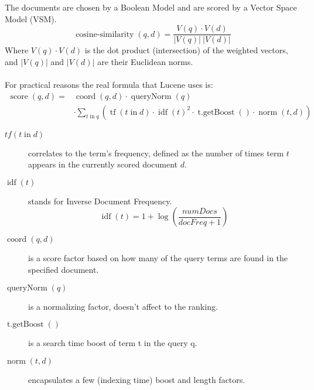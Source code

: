 The documents are chosen by a Boolean Model and are scored by a Vector Space
Model (VSM).
\[
	\operatorname{cosine-similarity}(q,d) = \frac{V(q) \cdot V(d)} {|V(q)|\ |V(d)|}
\]
%
Where \(V(q) \cdot V(d)\) is the dot product (intersection) of the weighted
vectors, and \(|V(q)|\) and \(|V(d)|\) are their Euclidean norms.\\
\\
For practical reasons the real formula that Lucene uses is:
%
\begin{equation*}
\begin{split}
	\operatorname{score}(q,d) =
	& \operatorname{coord}(q,d) \cdot
		\operatorname{queryNorm}(q)  \\
	& \cdot
		\sum_{t \operatorname{in} q} (
			\operatorname{tf}(t\operatorname{in}d) \cdot
			\operatorname{idf}(t)^{2} \cdot
			\operatorname{t.getBoost}() \cdot
			\operatorname{norm}(t,d)
		)
\end{split}
\end{equation*}
%
\begin{description}

\item[\(tf(t\operatorname{in}d)\)]
correlates to the term's frequency, defined as the number of times term \(t\)
appears in the currently scored document \(d\).

\item[\(\operatorname{idf}(t)\)]
stands for Inverse Document Frequency.
\[
	\operatorname{idf}(t) = 1 + \log(\frac{numDocs}{docFreq + 1})
\]

\item[\(\operatorname{coord}(q,d)\)]
is a score factor based on how many of the query terms are found in the
specified document.

\item[\(\operatorname{queryNorm}(q)\)]
is a normalizing factor, doesn’t affect to the ranking.

\item[\(\operatorname{t.getBoost}()\)]
is a search time boost of term t in the query q.

\item[\(\operatorname{norm}(t,d)\)]
encapsulates a few (indexing time) boost and length factors.

\end{description}

